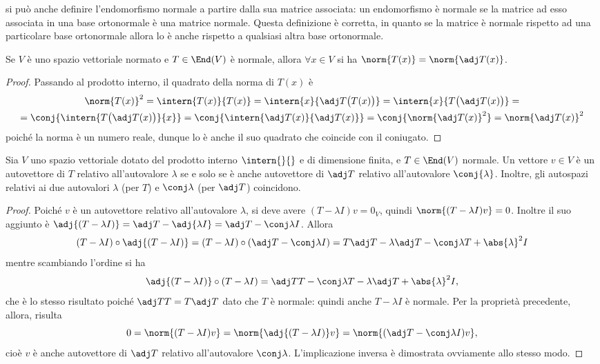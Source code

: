 si può anche definire l'endomorfismo normale a partire dalla sua matrice associata: un endomorfismo è normale se la matrice ad esso associata in una base ortonormale è una matrice normale.
Questa definizione è corretta, in quanto se la matrice è normale rispetto ad una particolare base ortonormale allora lo è anche rispetto a qualsiasi altra base ortonormale.
\begin{proprieta}
	Se $V$ è uno spazio vettoriale normato e $T\in\End(V)$ è normale, allora $\forall  x\in V$ si ha $\norm{T(  x)}=\norm{\adj T(  x)}$.
\end{proprieta}
\begin{proof}
Passando al prodotto interno, il quadrato della norma di $T(  x)$ è
\begin{multline*}
	\norm{T(  x)}^2=\intern{T(  x)}{T(  x)}=\intern{  x}{\adj T\big(T(  x)\big)}=\intern{  x}{T\big(\adj T(  x)\big)}=\\
	=\conj{\intern{T\big(\adj T(  x)\big)}{  x}}=\conj{\intern{\adj T(  x)}{\adj T(  x)}}=\conj{\norm{\adj T(  x)}^2}=\norm{\adj T(  x)}^2
\end{multline*}
poich\'e la norma è un numero reale, dunque lo è anche il suo quadrato che coincide con il coniugato. 
\end{proof}
\begin{teorema} \label{t:autovalori-operatore-normale}
	Sia $V$ uno spazio vettoriale dotato del prodotto interno $\intern{}{}$ e di dimensione finita, e $T\in\End(V)$ normale.
	Un vettore $  v\in V$ è un autovettore di $T$ relativo all'autovalore $\lambda$ se e solo se è anche autovettore di $\adj T$ relativo all'autovalore $\conj{\lambda}$.
	Inoltre, gli autospazi relativi ai due autovalori $\lambda$ (per $T$) e $\conj\lambda$ (per $\adj T$) coincidono.
\end{teorema}
\begin{proof}
	Poich\'e $  v$ è un autovettore relativo all'autovalore $\lambda$, si deve avere $(T-\lambda I)  v=0_V$, quindi $\norm{(T-\lambda I)  v}=0$.
	Inoltre il suo aggiunto è $\adj{(T-\lambda I)}=\adj T-\adj{\lambda I}=\adj T-\conj\lambda I$. Allora
	\begin{equation}
		(T-\lambda I)\circ\adj{(T-\lambda I)}=(T-\lambda I)\circ(\adj T-\conj\lambda I)=T\adj T-\lambda\adj T-\conj\lambda T+\abs{\lambda}^2 I	
	\end{equation}
	mentre scambiando l'ordine si ha
	\begin{equation}
		\adj{(T-\lambda I)}\circ(T-\lambda I)=\adj TT-\conj\lambda T-\lambda\adj T+\abs{\lambda}^2 I,
	\end{equation}
	che è lo stesso risultato poich\'e $\adj TT=T\adj T$ dato che $T$ è normale: quindi anche $T-\lambda I$ è normale.
	Per la proprietà precedente, allora, risulta
	\begin{equation}
		0=\norm{(T-\lambda I)  v}=\norm{\adj{(T-\lambda I)}  v}=\norm{(\adj T-\conj\lambda I)  v},
	\end{equation}
	cioè $  v$ è anche autovettore di $\adj T$ relativo all'autovalore $\conj\lambda$.
	L'implicazione inversa è dimostrata ovviamente allo stesso modo.
\end{proof}

